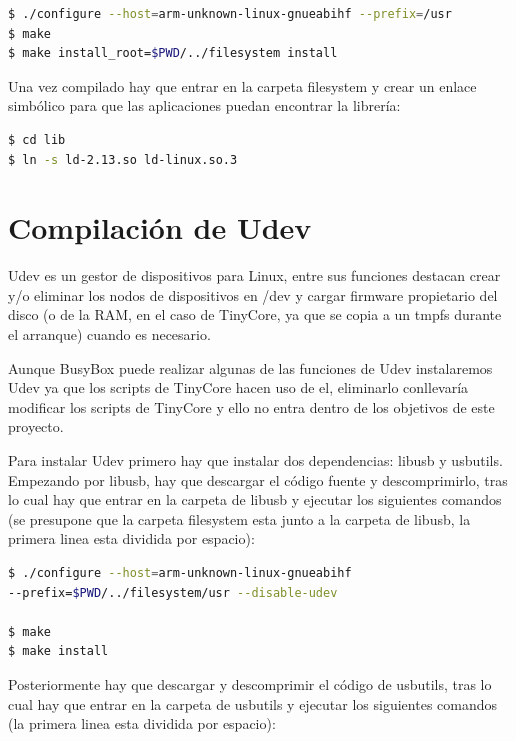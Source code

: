 \documentclass{tfg}
\begin{document}
\begin{lstlisting}[language=bash,caption=Compilacion de EGlibC]
$ ./configure --host=arm-unknown-linux-gnueabihf --prefix=/usr
$ make
$ make install_root=$PWD/../filesystem install
\end{lstlisting}

Una vez compilado hay que entrar en la carpeta filesystem y crear un enlace simbólico para que las aplicaciones
puedan encontrar la librería:


\begin{lstlisting}[language=bash,caption=Creacion del enlace simbolico para EGlibC]
$ cd lib
$ ln -s ld-2.13.so ld-linux.so.3
\end{lstlisting}

\section{Compilación de Udev}
Udev es un gestor de dispositivos para Linux, entre sus funciones destacan crear y/o eliminar los nodos de dispositivos en /dev y
cargar firmware propietario del disco (o de la RAM, en el caso de TinyCore, ya que se copia a un tmpfs durante el arranque)
cuando es necesario.
\\\par
Aunque BusyBox puede realizar algunas de las funciones de Udev instalaremos Udev ya que los scripts de TinyCore hacen uso de el,
eliminarlo conllevaría modificar los scripts de TinyCore y ello no entra dentro de los objetivos de este proyecto.
\\\par
Para instalar Udev primero hay que instalar dos dependencias: libusb y usbutils. Empezando por libusb, hay que descargar el código
fuente y descomprimirlo, tras lo cual hay que entrar en la carpeta de libusb y ejecutar los siguientes comandos (se presupone que la carpeta filesystem esta junto a la carpeta de libusb, la primera linea esta dividida por espacio):
\begin{lstlisting}[language=bash,caption=Compilacion de libusb]
$ ./configure --host=arm-unknown-linux-gnueabihf
--prefix=$PWD/../filesystem/usr --disable-udev

$ make
$ make install
\end{lstlisting}

Posteriormente hay que descargar y descomprimir el código de usbutils, tras lo cual hay que entrar en la carpeta de usbutils y
ejecutar los siguientes comandos (la primera linea esta dividida por espacio):
\end{document}
